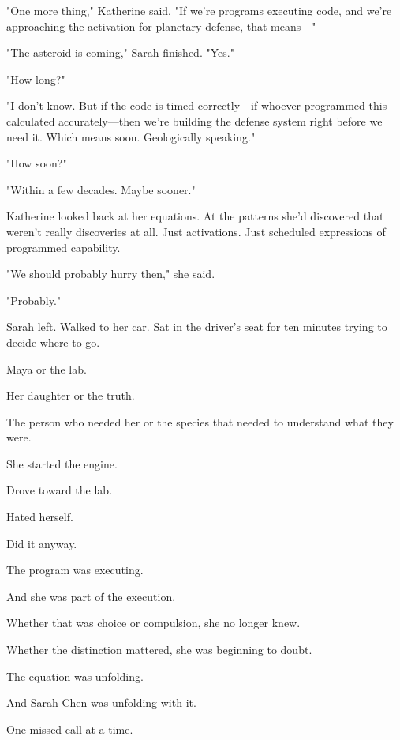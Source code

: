 "One more thing," Katherine said. "If we're programs executing code, and we're approaching the activation for planetary defense, that means—"

"The asteroid is coming," Sarah finished. "Yes."

"How long?"

"I don't know. But if the code is timed correctly—if whoever programmed this calculated accurately—then we're building the defense system right before we need it. Which means soon. Geologically speaking."

"How soon?"

"Within a few decades. Maybe sooner."

Katherine looked back at her equations. At the patterns she'd discovered that weren't really discoveries at all. Just activations. Just scheduled expressions of programmed capability.

"We should probably hurry then," she said.

"Probably."

Sarah left. Walked to her car. Sat in the driver's seat for ten minutes trying to decide where to go.

Maya or the lab.

Her daughter or the truth.

The person who needed her or the species that needed to understand what they were.

She started the engine.

Drove toward the lab.

Hated herself.

Did it anyway.

The program was executing.

And she was part of the execution.

Whether that was choice or compulsion, she no longer knew.

Whether the distinction mattered, she was beginning to doubt.

The equation was unfolding.

And Sarah Chen was unfolding with it.

One missed call at a time.

